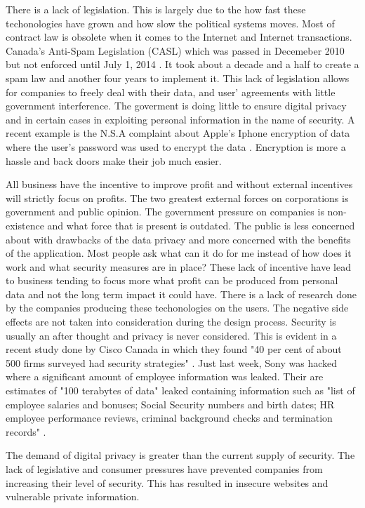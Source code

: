 \documentclass[12pt]{article}
\begin{document}
There is a lack of legislation. This is largely due to the how fast these techonologies have grown and how slow the political systems moves. Most of contract law is obsolete when it comes to the Internet and Internet transactions. Canada’s Anti-Spam Legislation (CASL) which was passed in Decemeber 2010 but not enforced until July 1, 2014 \cite{FastFacts}. It took about a decade and a half to create a spam law and another four years to implement it. This lack of legislation allows for companies to freely deal with their data, and user' agreements with little government interference. The goverment is doing little to ensure digital privacy and in certain cases in exploiting personal information in the name of security. A recent example is the N.S.A complaint about Apple's Iphone encryption of data where the user's password was used to encrypt the data \cite{Schneier}. Encryption is more a hassle and back doors make their job much easier.

All business have the incentive to improve profit and without external incentives will strictly focus on profits. The two greatest external forces on corporations is government and public opinion. The government pressure on companies is non-existence and what force that is present is outdated. The public is less concerned about with drawbacks of the data privacy and more concerned with the benefits of the application. Most people ask what can it do for me instead of how does it work and what security measures are in place? These lack of incentive have lead to business tending to focus more what profit can be produced from personal data and not the long term impact it could have. There is a lack of research done by the companies producing these techonologies on the users. The negative side effects are not taken into consideration during the design process. Security is usually an after thought and privacy is never considered. This is evident in a recent study done by Cisco Canada in which they found "40 per cent of about 500 firms surveyed had security strategies" \cite{Blackwell}. Just last week, Sony was hacked where a significant amount of employee information was leaked. Their are estimates of "100 terabytes of data" leaked containing information such as "list of employee salaries and bonuses; Social Security numbers and birth dates; HR employee performance reviews, criminal background checks and termination records" \cite{Zetter}.

The demand of digital privacy is greater than the current supply of security. The lack of legislative and consumer pressures have prevented companies from increasing their level of security. This has resulted in insecure websites and vulnerable private information. 
\end{document}
